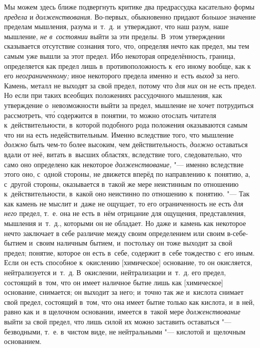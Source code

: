 Мы можем здесь ближе подвергнуть критике два предрассудка касательно формы
{\em предела} и {\em долженствования}. Во-первых, обыкновенно придают
{\em большое} значение пределам мышления, разума
и~т.~д. и~утверждают, что наш разум, наше мышление,
{\em не в~состоянии} выйти за эти пределы. В~этом
утверждении сказывается отсутствие сознания того, что, определяя нечто как предел,
мы тем самым уже вышли за этот предел. Ибо некоторая определённость, граница,
определяется как предел лишь в~противоположность к~его иному вообще, как
к его {\em неограниченному;} иное некоторого предела
именно и~есть {\em выход} за него. Камень, металл не
выходят за свой предел, потому что {\em для них} он не
есть предел. Но если при таких всеобщих положениях рассудочного мышления,
как утверждение о~невозможности выйти за предел, мышление не хочет
потрудиться рассмотреть, чт\'{о} содержится в~понятии, то можно отослать
читателя к~действительности, в~которой подобного рода положения оказываются
самым что ни на есть недействительным. Именно вследствие того, что мышление
{\em должно} быть чем-то более высоким, чем
действительность, {\em должно} оставаться вдали от неё,
витать в~высших областях, вследствие того, следовательно, что само оно
определено как некоторое {\em долженствование,} "---
именно вследствие этого оно, с~одной стороны, не движется вперёд по
направлению к~понятию, а, с~другой стороны, оказывается в~такой же мере
неистинным по отношению к~действительности, в~какой оно неистинно по
отношению к~понятию. "--- Так как камень не мыслит и~даже не ощущает, то его
ограниченность не есть {\em для него} предел, т.~е. она
не есть в~нём отрицание для ощущения, представления, мышления и~т.~д.,
которыми он не обладает. Но даже и~камень как некоторое нечто заключает в
себе различие между своим определением или своим в-себе-бытием и~своим
наличным бытием, и~постольку он тоже выходит за свой предел; понятие,
которое он есть в~себе, содержит в~себе тождество с~его иным. Если он
есть способное к~окислению [химическое] основание, то он окисляется,
нейтрализуется и~т.~д. В~окислении, нейтрализации и~т.~д. его предел,
состоящий в~том, что он имеет наличное бытие лишь как [химическое]
основание, снимается; он выходит за него; и~точно так же и~кислота снимает
свой предел, состоящий в~том, что она имеет бытие только как кислота, и~в
ней, равно как и~в щелочном основании, имеется в~такой мере
{\em долженствование} выйти за свой предел, что лишь
силой их можно заставить оставаться "--- безводными, т.~е. в~чистом виде, не
нейтральными "--- кислотой и~щелочным основанием.

